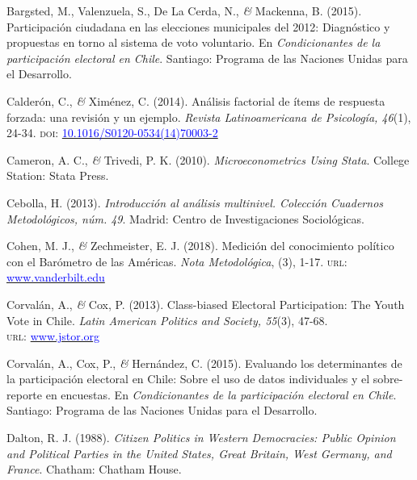 \documentclass[a4paper]{tufte-handout}
\begin{document}
{{{{{{{{{{{{{\begin{list}{}
\item{\small Bargsted, M., Valenzuela, S., De La Cerda, N., {\itshape \&} Mackenna, B. (2015). Participación ciudadana en las elecciones municipales del 2012: Diagnóstico y propuestas en torno al sistema de voto voluntario. En {\itshape Condicionantes de la participación electoral en Chile}. Santiago: Programa de las Naciones Unidas para el Desarrollo.}

\item{\small Calderón, C., {\itshape \&} Ximénez, C. (2014). Análisis factorial de ítems de respuesta forzada: una revisión y un ejemplo. {\itshape Revista Latinoamericana de Psicología, 46}(1), 24-34. {\scshape doi:} \href{https://doi.org/10.1016/S0120-0534(14)70003-2}{\textcolor{blue}{10.1016/S0120-0534(14)70003-2}}}

\item{\small Cameron, A. C., {\itshape \&} Trivedi, P. K. (2010). {\itshape Microeconometrics Using Stata}. College Station: Stata Press.}

\item{\small Cebolla, H. (2013). {\itshape Introducción al análisis multinivel. Colección Cuadernos Metodológicos, núm. 49}. Madrid: Centro de Investigaciones Sociológicas.}

\item{\small Cohen, M. J., {\itshape \&} Zechmeister, E. J. (2018). Medición del conocimiento político con el Barómetro de las Américas. {\itshape Nota Metodológica}, (3), 1-17. {\scshape url:} \href{https://www.vanderbilt.edu/lapop/insights/IMN003es.pdf}{\textcolor{blue}{www.vanderbilt.edu}}}

\item{\small Corvalán, A., {\itshape \&} Cox, P. (2013). Class-biased Electoral Participation: The Youth Vote in Chile. {\itshape Latin American Politics and Society, 55}(3), 47-68. \\ {\scshape url:} \href{https://www.jstor.org/stable/43284847}{\textcolor{blue}{www.jstor.org}}}

\item{\small Corvalán, A., Cox, P., {\itshape \&} Hernández, C. (2015). Evaluando los determinantes de la participación electoral en Chile: Sobre el uso de datos individuales y el sobre-reporte en encuestas. En {\itshape Condicionantes de la participación electoral en Chile}. Santiago: Programa de las Naciones Unidas para el Desarrollo.}

\item{\small Dalton, R. J. (1988). {\itshape Citizen Politics in Western Democracies: Public Opinion and Political Parties in the United States, Great Britain, West Germany, and France}. Chatham: Chatham House.}


\end{list}}}}}}}}}}}}}}
\end{document}
